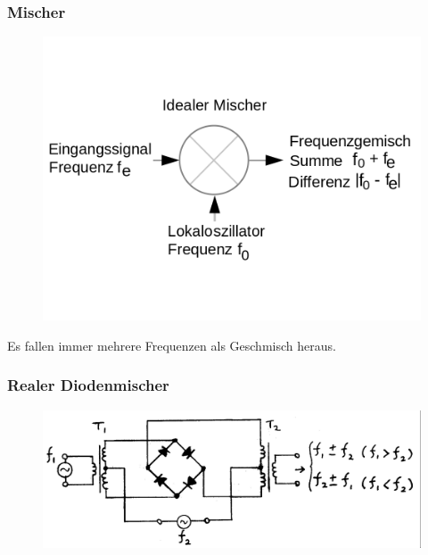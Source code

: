 \begin{frame}
  \frametitle{Mischer}
  \begin{center}
    \begin{figure}
      \includegraphics[width=.8\textwidth,height=.65\textheight,keepaspectratio]{e15/IdealerMischer.png}
    \end{figure}
  \end{center}
  Es fallen immer mehrere Frequenzen als Geschmisch heraus.
\end{frame}

\begin{frame}
  \frametitle{Realer Diodenmischer}
  \begin{center}
    \begin{figure}
      \includegraphics[width=.9\textwidth,height=.75\textheight,keepaspectratio]{e15/Realer-Diodenmischer.png}
    \end{figure}
  \end{center}
\end{frame}

